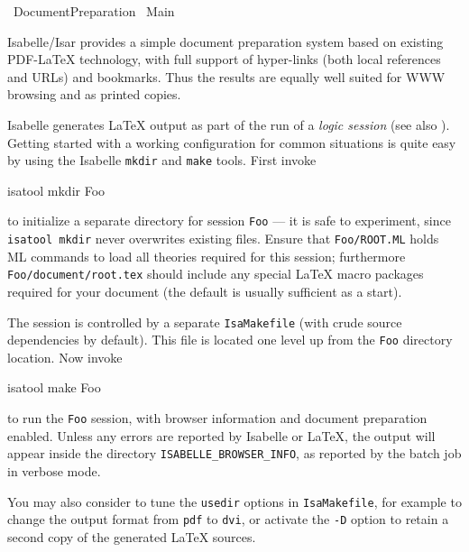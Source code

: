 %
\begin{isabellebody}%
\def\isabellecontext{Document{\isacharunderscore}Preparation}%
%
\isadelimtheory
\isanewline
\isanewline
%
\endisadelimtheory
%
\isatagtheory
{}\isamarkupfalse%
\ Document{\isacharunderscore}Preparation\isanewline
{}\ Main\isanewline
{}%
\endisatagtheory
{\isafoldtheory}%
%
\isadelimtheory
%
\endisadelimtheory
%
\isamarkuptrue%
%
\begin{isamarkuptext}%
Isabelle/Isar provides a simple document preparation system based on
  existing {PDF-\LaTeX} technology, with full support of hyper-links
  (both local references and URLs) and bookmarks.  Thus the results
  are equally well suited for WWW browsing and as printed copies.

  \medskip Isabelle generates {\LaTeX} output as part of the run of a
  \emph{logic session} (see also \cite{isabelle-sys}).  Getting
  started with a working configuration for common situations is quite
  easy by using the Isabelle \verb|mkdir| and \verb|make|
  tools.  First invoke
\begin{ttbox}
  isatool mkdir Foo
\end{ttbox}
  to initialize a separate directory for session \verb|Foo| ---
  it is safe to experiment, since \verb|isatool mkdir| never
  overwrites existing files.  Ensure that \verb|Foo/ROOT.ML|
  holds ML commands to load all theories required for this session;
  furthermore \verb|Foo/document/root.tex| should include any
  special {\LaTeX} macro packages required for your document (the
  default is usually sufficient as a start).

  The session is controlled by a separate \verb|IsaMakefile|
  (with crude source dependencies by default).  This file is located
  one level up from the \verb|Foo| directory location.  Now
  invoke
\begin{ttbox}
  isatool make Foo
\end{ttbox}
  to run the \verb|Foo| session, with browser information and
  document preparation enabled.  Unless any errors are reported by
  Isabelle or {\LaTeX}, the output will appear inside the directory
  \verb|ISABELLE_BROWSER_INFO|, as reported by the batch job in
  verbose mode.

  \medskip You may also consider to tune the \verb|usedir|
  options in \verb|IsaMakefile|, for example to change the output
  format from \verb|pdf| to \verb|dvi|, or activate the
  \verb|-D| option to retain a second copy of the generated
  {\LaTeX} sources.


\end{isamarkuptext}
\end{isabellebody}

